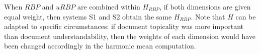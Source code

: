 When $RBP$ and $uRBP$ are combined within $H_{RBP}$, if both dimensions are given equal weight, then systems S1 and S2 obtain the same $H_{RBP}$. Note that $H$ can be adapted to specific circumstances: if document topicality was more important than document understandability, then the weights of each dimension would have been changed accordingly in the harmonic mean computation. 




%
%
%
%

 


